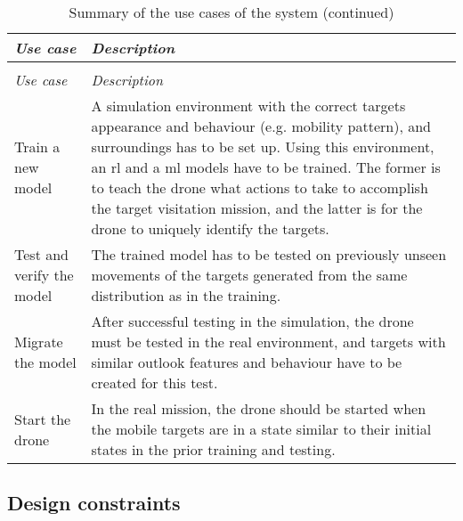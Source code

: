 \documentclass[../main.tex]{subfiles}
\begin{document}
\begin{center}
    \begin{xltabular}{\textwidth}{ p{3.5cm} X }
        \caption{Summary of the use cases of the system.}
        \label{tab:use-case-summaries} \\
        \toprule

        \textit{Use case} & \textit{Description} 
        \\

        \midrule
        \endfirsthead

        \caption[]{Summary of the use cases of the system (continued)} \\
        \toprule

        \textit{Use case} & \textit{Description} 
        \\

        \midrule
        \endhead

        Train a new model
          & A simulation environment with the correct targets
          appearance and behaviour (e.g. mobility pattern), and
          surroundings has to be set up. 
          Using this environment, an \gls{rl} and a \gls{ml} models
          have to be trained. 
          The former is to teach the drone what actions to take to
          accomplish the target visitation mission, and the latter is
          for the drone to uniquely identify the targets. 
        \\
        Test and verify the model
            & The trained model has to be tested on previously unseen
            movements of the targets generated from the same
            distribution as in the training.
        \\
        Migrate the model
            & After successful testing in the simulation, the drone
            must be tested in the real environment, and targets with
            similar outlook features and behaviour have to be created
            for this test.
        \\
        Start the drone
            & In the real mission, the drone should be started when
            the mobile targets are in a state similar to their initial
            states in the prior training and testing.
        \\

        \bottomrule
    \end{xltabular}
\end{center}
\vspace{-1.5cm}
%
\subsection{Design constraints}
\end{document}
